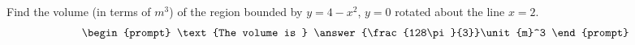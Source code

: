 \documentclass{ximera}
\author{Gregory Hartman \and Matthew Carr}
\begin{document}
\begin{exercise}






Find the volume (in terms of $\unit{m}^3$) of the region bounded by $y=4-x^2$, $y=0$ rotated about the line $x=2$.
\[
\begin{prompt}
\text{The volume is } \answer{\frac{128\pi}{3}}\unit{m}^3
\end{prompt}
\]




\end{exercise}
\end{document}
